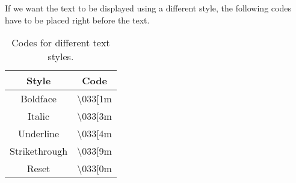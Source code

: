 If we want the text to be displayed using a different style, the following codes have to be placed right before the text.

\begin{table}[h!]
\centering
\begin{tabular}{ |c|c| }
    \hline
    \textbf{Style} & \textbf{Code} \\
    \hline
    Boldface & \textbackslash 033[1m \\
    \hline
    Italic & \textbackslash 033[3m \\
    \hline
    Underline & \textbackslash 033[4m \\
    \hline
    Strikethrough & \textbackslash 033[9m \\
    \hline
    Reset & \textbackslash 033[0m \\
    \hline
\end{tabular}
\caption{Codes for different text styles.}
\end{table}
